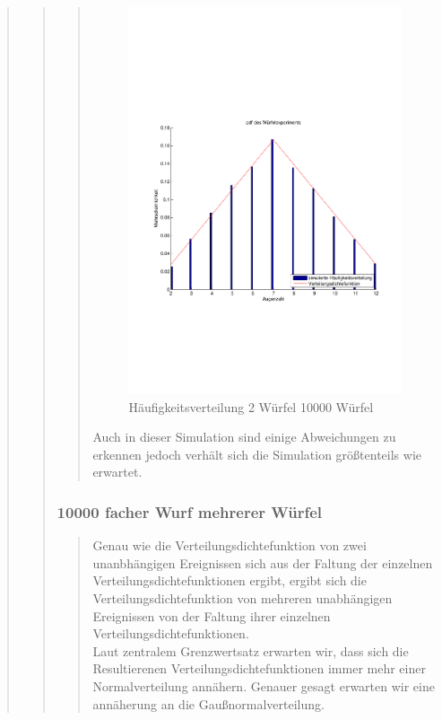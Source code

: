 \begin{quote}
\begin{quote}
\begin{quote}
                \begin{figure}[H] \centering
                    \includegraphics[scale=0.5, trim = 2cm 6.5cm 1.5cm 8.5cm, clip]{./Bilder/2wuerfelpdf}
                        \caption{Häufigkeitsverteilung 2 Würfel 10000 Würfel}
                \end{figure}
            
            Auch in dieser Simulation sind einige Abweichungen zu erkennen jedoch verhält sich die Simulation
            größtenteils wie erwartet.\\       
        \end{quote}
        
        \subsubsection{10000 facher Wurf mehrerer Würfel}
		\begin{quote}
			Genau wie die Verteilungsdichtefunktion von zwei unanbhängigen Ereignissen sich aus der Faltung der einzelnen
			Verteilungsdichtefunktionen ergibt, ergibt sich die Verteilungsdichtefunktion von mehreren unabhängigen Ereignissen
			von der Faltung ihrer einzelnen Verteilungsdichtefunktionen.\\
			Laut zentralem Grenzwertsatz erwarten wir, dass sich die Resultierenen Verteilungsdichtefunktionen immer mehr einer
			Normalverteilung annähern. Genauer gesagt erwarten wir eine annäherung an die Gaußnormalverteilung.


\end{quote}
\end{quote}
\end{quote}
